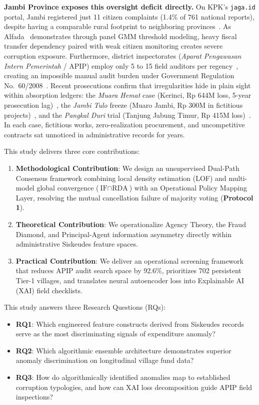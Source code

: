 \documentclass[conference]{IEEEtran}
\begin{document}
\textbf{Jambi Province exposes this oversight deficit directly.} On KPK's \texttt{jaga.id} portal, Jambi registered just 11 citizen complaints (1.4\% of 761 national reports), despite having a comparable rural footprint to neighboring provinces~\cite{ref26}. As Alfada~\cite{ref27} demonstrates through panel GMM threshold modeling, heavy fiscal transfer dependency paired with weak citizen monitoring creates severe corruption exposure. Furthermore, district inspectorates (\textit{Aparat Pengawasan Intern Pemerintah} / APIP) employ only 5 to 15 field auditors per regency~\cite{ref12}, creating an impossible manual audit burden under Government Regulation No.\ 60/2008~\cite{ref33}. Recent prosecutions confirm that irregularities hide in plain sight within absorption ledgers: the \textit{Muara Hemat} case (Kerinci, Rp 644M loss, 5-year prosecution lag)~\cite{ref28,ref30}, the \textit{Jambi Tulo} freeze (Muaro Jambi, Rp 300M in fictitious projects)~\cite{ref29}, and the \textit{Pangkal Duri} trial (Tanjung Jabung Timur, Rp 415M loss)~\cite{ref31}. In each case, fictitious works, zero-realization procurement, and uncompetitive contracts sat unnoticed in administrative records for years.

This study delivers three core contributions:
\begin{enumerate}
    \item \textbf{Methodological Contribution}: We design an unsupervised Dual-Path Consensus framework combining local density estimation (LOF) and multi-model global convergence ($\text{IF} \cap \text{RDA}$) with an Operational Policy Mapping Layer, resolving the mutual cancellation failure of majority voting (\textbf{Protocol 1}).
    \item \textbf{Theoretical Contribution}: We operationalize Agency Theory, the Fraud Diamond, and Principal-Agent information asymmetry directly within administrative Siskeudes feature spaces.
    \item \textbf{Practical Contribution}: We deliver an operational screening framework that reduces APIP audit search space by 92.6\%, prioritizes 702 persistent Tier-1 villages, and translates neural autoencoder loss into Explainable AI (XAI) field checklists.
\end{enumerate}

This study answers three Research Questions (RQs):
\begin{itemize}
    \item \textbf{RQ1}: Which engineered feature constructs derived from Siskeudes records serve as the most discriminating signals of expenditure anomaly?
    \item \textbf{RQ2}: Which algorithmic ensemble architecture demonstrates superior anomaly discrimination on longitudinal village fund data?
    \item \textbf{RQ3}: How do algorithmically identified anomalies map to established corruption typologies, and how can XAI loss decomposition guide APIP field inspections?
\end{itemize}
\end{document}
